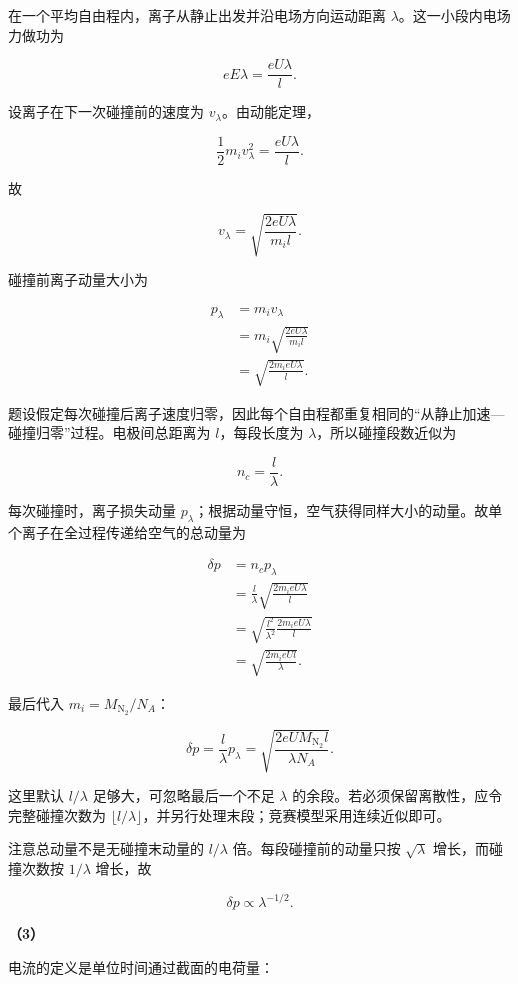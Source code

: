 \documentclass[12pt,a4paper,UTF8]{ctexart}
\begin{document}
在一个平均自由程内，离子从静止出发并沿电场方向运动距离
\(\lambda\)。这一小段内电场力做功为

\[eE\lambda=\frac{eU\lambda}{l}.\]

设离子在下一次碰撞前的速度为 \(v_\lambda\)。由动能定理，

\[\frac12m_iv_\lambda^2=\frac{eU\lambda}{l}.\]

故

\[v_\lambda=\sqrt{\frac{2eU\lambda}{m_il}}.\]

碰撞前离子动量大小为

\[\begin{aligned}
p_\lambda
&=m_iv_\lambda\\
&=m_i\sqrt{\frac{2eU\lambda}{m_il}}\\
&=\sqrt{\frac{2m_ieU\lambda}{l}}.
\end{aligned}\]

题设假定每次碰撞后离子速度归零，因此每个自由程都重复相同的``从静止加速---碰撞归零''过程。电极间总距离为
\(l\)，每段长度为 \(\lambda\)，所以碰撞段数近似为

\[n_c=\frac l\lambda.\]

每次碰撞时，离子损失动量
\(p_\lambda\)；根据动量守恒，空气获得同样大小的动量。故单个离子在全过程传递给空气的总动量为

\[\begin{aligned}
\delta p
&=n_cp_\lambda\\
&=\frac l\lambda
\sqrt{\frac{2m_ieU\lambda}{l}}\\
&=\sqrt{\frac{l^2}{\lambda^2}
\frac{2m_ieU\lambda}{l}}\\
&=\sqrt{\frac{2m_ieUl}{\lambda}}.
\end{aligned}\]

最后代入 \(m_i=M_{\mathrm{N_2}}/N_A\)：

\[\delta p=\frac{l}{\lambda}p_\lambda
=\boxed{\sqrt{\frac{2eUM_{\mathrm{N_2}}l}{\lambda N_A}}}.\]

这里默认 \(l/\lambda\) 足够大，可忽略最后一个不足 \(\lambda\)
的余段。若必须保留离散性，应令完整碰撞次数为
\(\lfloor l/\lambda\rfloor\)，并另行处理末段；竞赛模型采用连续近似即可。

注意总动量不是无碰撞末动量的 \(l/\lambda\) 倍。每段碰撞前的动量只按
\(\sqrt{\lambda}\) 增长，而碰撞次数按 \(1/\lambda\) 增长，故

\[\delta p\propto\lambda^{-1/2}.\]

\textbf{（3）}

电流的定义是单位时间通过截面的电荷量：
\end{document}
